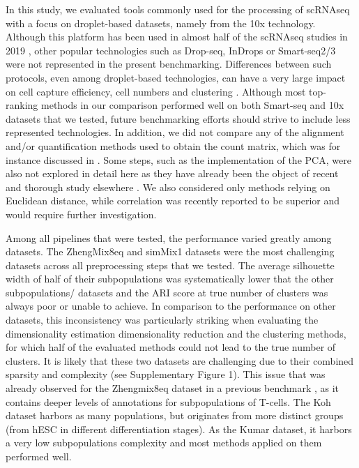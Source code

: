 \documentclass{bmcart}
\begin{document}
In this study, we evaluated tools commonly used for the processing of scRNAseq with a focus on droplet-based datasets, namely from the 10x technology. Although this platform has been used in almost half of the scRNAseq studies in 2019 \cite{SvenssonDB2019}, other popular technologies such as Drop-seq, InDrops or Smart-seq2/3 were not represented in the present benchmarking. Differences between such protocols, even among droplet-based technologies, can have a very large impact on cell capture efficiency, cell numbers and clustering \cite{MereuCellAtlas2019, ZhangDroplet2019, SalomonDroplet2019}. Although most top-ranking methods in our comparison performed well on both Smart-seq and 10x datasets that we tested, future benchmarking efforts should strive to include less represented technologies. In addition, we did not compare any of the alignment and/or quantification methods used to obtain the count matrix, which was for instance discussed in \cite{viethSystematic2019}. Some steps, such as the implementation of the PCA, were also not explored in detail here as they have already been the object of recent and thorough study elsewhere \cite{SunDimRed2019, TsuyuzakiPCA2020}. We also considered only methods relying on Euclidean distance, while correlation was recently reported to be superior\cite{kim_impact_2019} and would require further investigation.

Among all pipelines that were tested, the performance varied greatly among datasets. The ZhengMix8eq and simMix1 datasets were the most challenging datasets across all preprocessing steps that we tested. The average silhouette width of half of their subpopulations was systematically lower that the other subpopulations/ datasets and the ARI score at true number of clusters was always poor or unable to achieve. In comparison to the performance on other datasets, this inconsistency was particularly striking when evaluating the dimensionality estimation dimensionality reduction and the clustering methods, for which half of the evaluated methods could not lead to the true number of clusters. It is likely that these two datasets are challenging due to their combined sparsity and complexity (see Supplementary Figure 1). This issue that was already observed for the Zhengmix8eq dataset in a previous benchmark \cite{duoClustering2018}, as it contains deeper levels of annotations for subpopulations of T-cells. The Koh dataset harbors as many populations, but originates from more distinct groups (from hESC in different differentiation stages). As the Kumar dataset, it harbors a very low subpopulations complexity and most methods applied on them performed well.
\end{document}
